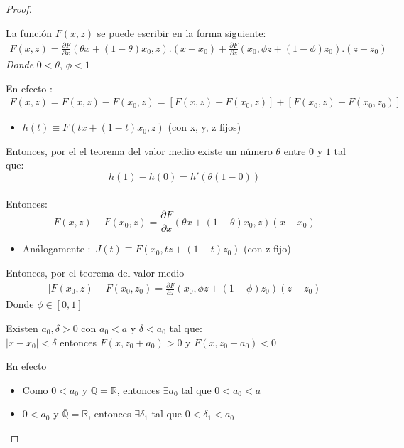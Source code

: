\begin{proof}
\begin{Afi}
La funci\'on $F(x,z)$ se puede escribir en la forma siguiente: \\
\begin{eqnarray}
    F(x,z)= \frac{\partial F}{\partial x}(\theta x +(1-\theta)x_{0},z).(x-x_{0})+\frac{\partial F}{\partial z}(x_{0},\phi z +(1-\phi)z_{0}).(z-z_{0})
    \label{asterisco}
\end{eqnarray}
   \textit{Donde }$0< \theta$, $\phi <1$
\end{Afi}
En efecto :
    \begin{eqnarray}
   F(x,z)= F(x,z)-F(x_{0},z) = [F(x,z)-F(x_{0},z)] +  [F(x_{0},z)-F(x_{0},z_{0})]
   \label{uno}
    \end{eqnarray}
     \begin{itemize}
         \item $h(t)\equiv F(tx+(1-t)x_{0},z)$ (con x, y, z fijos)
     \end{itemize}
Entonces, por el el teorema del valor medio existe un número $\theta$ entre $0$ y $1$ tal que:\\
$$h(1)-h(0)=h'(\theta (1-0))$$\\Entonces: 
$$F(x,z)-F(x_{0},z)=\frac{\partial F}{\partial x}(\theta x + (1-\theta)x_{0},z)(x-x_{0}) $$
\begin{itemize}
    \item An\'alogamente :\ $J(t)\equiv F(x_{0},tz+(1-t)z_{0})$ (con z fijo)
\end{itemize}
Entonces, por el teorema del valor medio
\begin{eqnarray}
  |F(x_{0},z)-F(x_{0},z_{0})=\frac{\partial F}{\partial z}(x_{0},\phi z + (1-\phi)z_{0})(z-z_{0}) 
 \label{tres}
\end{eqnarray}
Donde $ \phi\in[0,1]$
\begin{Afi}
Existen $a_{0}, \delta > 0$ con $a_{0} < a$ y $\delta <a_{0}$ tal que:\\
$|x-x_{0}|<\delta$  entonces $F(x, z_{0}+ a_{0}) > 0$ y $F(x, z_{0}-a_{0}) < 0$
\end{Afi}
En efecto
\begin{itemize}
    \item Como $0<a_{0}$ y $\bar{\mathbb{Q}}= \mathbb{R}$, entonces $\exists a_{0}$ tal que $0< a_{0}<a $
\end{itemize}
\begin{itemize}
    \item $0 < a_{0}$ y $\bar{\mathbb{Q}}= \mathbb{R}$, entonces $\exists \delta_{1}$ tal que $0 < \delta_{1} < a_{0}$\\
    

\end{itemize}
\end{proof}
